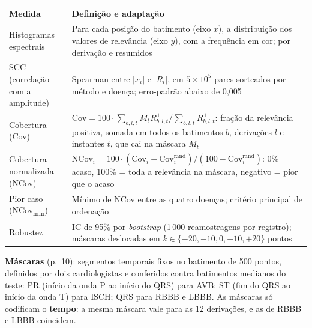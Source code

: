 \documentclass[11pt,a4paper]{article}
\begin{document}
\begin{center}\small
\begin{tabularx}{\linewidth}{p{3.1cm}X}
\toprule
\textbf{Medida} & \textbf{Definição e adaptação} \\
\midrule
Histogramas espectrais & Para cada posição do batimento (eixo $x$), a distribuição dos valores de relevância (eixo $y$), com a frequência em cor; por derivação e resumidos \\ \addlinespace
SCC (correlação com a amplitude) & Spearman entre $|x_i|$ e $|R_i|$, em $5\times10^5$ pares sorteados por método e doença; erro-padrão abaixo de 0,005 \\ \addlinespace
Cobertura (Cov) & $\text{Cov} = 100\cdot\sum_{b,l,t} M_t R^+_{b,l,t} \big/ \sum_{b,l,t} R^+_{b,l,t}$: fração da relevância positiva, somada em todos os batimentos $b$, derivações $l$ e instantes $t$, que cai na máscara $M_t$ \\ \addlinespace
Cobertura normalizada (NCov) & $\text{NCov}_i = 100\cdot(\text{Cov}_i - \text{Cov}^{\text{rand}}_i)/(100 - \text{Cov}^{\text{rand}}_i)$: 0\% = acaso, 100\% = toda a relevância na máscara, negativo = pior que o acaso \\ \addlinespace
Pior caso (NCov\textsubscript{min}) & Mínimo de NCov entre as quatro doenças; critério principal de ordenação \\ \addlinespace
Robustez & IC de 95\% por \textit{bootstrap} (1\,000 reamostragens por registro); máscaras deslocadas em $k \in \{-20, -10, 0, +10, +20\}$ pontos \\
\bottomrule
\end{tabularx}
\end{center}
\textbf{Máscaras} (p.~10): segmentos temporais fixos no batimento de 500 pontos, definidos por dois cardiologistas e conferidos contra batimentos medianos do teste: PR (início da onda P ao início do QRS) para AVB; ST (fim do QRS ao início da onda T) para ISCH; QRS para RBBB e LBBB. As máscaras só codificam o \textbf{tempo}: a mesma máscara vale para as 12 derivações, e as de RBBB e LBBB coincidem.
\end{document}
